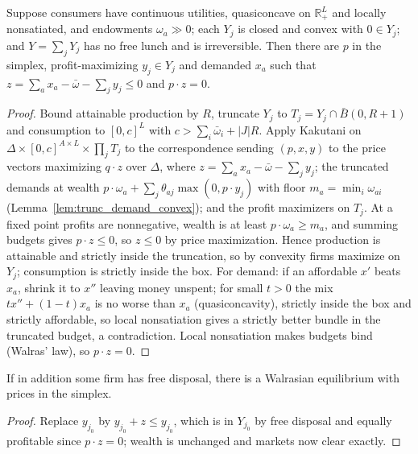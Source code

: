 \begin{theorem}
\label{thm:free_disposal_equilibrium_ad}
\leanok
{}
Suppose consumers have continuous utilities, quasiconcave on $\mathbb{R}^L_+$ and locally nonsatiated, and endowments
$\omega_a \gg 0$; each $Y_j$ is closed and convex with $0 \in Y_j$; and $Y = \sum_j Y_j$ has no free lunch and is
irreversible. Then there are $p$ in the simplex, profit-maximizing $y_j \in Y_j$ and demanded $x_a$ such that
$z = \sum_a x_a - \bar\omega - \sum_j y_j \le 0$ and $p \cdot z = 0$.
\end{theorem}
\begin{proof}
\leanok
Bound attainable production by $R$, truncate $Y_j$ to $T_j = Y_j \cap \bar B(0, R+1)$ and consumption to $[0, c]^L$ with
$c > \sum_i \bar\omega_i + |J| R$. Apply Kakutani on $\Delta \times [0,c]^{A \times L} \times \prod_j T_j$ to the
correspondence sending $(p, x, y)$ to the price vectors maximizing $q \cdot z$ over $\Delta$, where
$z = \sum_a x_a - \bar\omega - \sum_j y_j$; the truncated demands at wealth $p \cdot \omega_a + \sum_j \theta_{aj}
\max(0, p \cdot y_j)$ with floor $m_a = \min_i \omega_{ai}$ (Lemma~\ref{lem:trunc_demand_convex}); and the profit
maximizers on $T_j$. At a fixed point profits are nonnegative, wealth is at least $p \cdot \omega_a \ge m_a$, and summing
budgets gives $p \cdot z \le 0$, so $z \le 0$ by price maximization. Hence production is attainable and strictly inside
the truncation, so by convexity firms maximize on $Y_j$; consumption is strictly inside the box. For demand: if an
affordable $x'$ beats $x_a$, shrink it to $x''$ leaving money unspent; for small $t > 0$ the mix $t x'' + (1-t) x_a$ is
no worse than $x_a$ (quasiconcavity), strictly inside the box and strictly affordable, so local nonsatiation gives a
strictly better bundle in the truncated budget, a contradiction. Local nonsatiation makes budgets bind (Walras' law), so
$p \cdot z = 0$.
\end{proof}

\begin{theorem}
\label{thm:existence_arrow_debreu_lns}
\leanok
{}
If in addition some firm has free disposal, there is a Walrasian equilibrium with prices in the simplex.
\end{theorem}
\begin{proof}
\leanok
Replace $y_{j_0}$ by $y_{j_0} + z \le y_{j_0}$, which is in $Y_{j_0}$ by free disposal and equally profitable since
$p \cdot z = 0$; wealth is unchanged and markets now clear exactly.
\end{proof}

